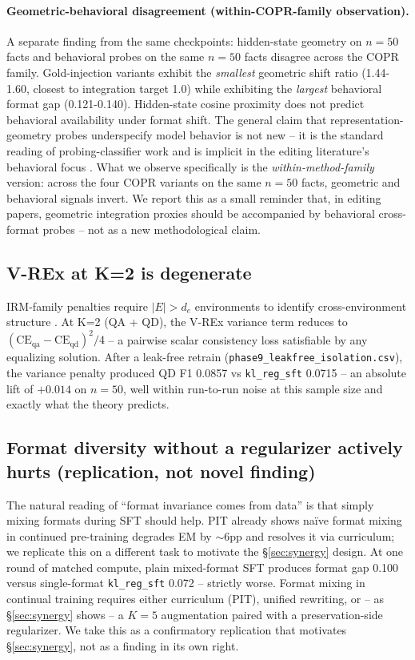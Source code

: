 \documentclass[11pt]{article}
\newcommand{\code}[1]{\texttt{\small #1}}
\begin{document}
\paragraph{Geometric-behavioral disagreement (within-COPR-family observation).}
A separate finding from the same checkpoints: hidden-state geometry on
$n=50$ facts and behavioral probes on the same $n=50$ facts disagree across
the COPR family. Gold-injection variants exhibit the \emph{smallest}
geometric shift ratio (1.44-1.60, closest to integration target 1.0) while
exhibiting the \emph{largest} behavioral format gap (0.121-0.140).
Hidden-state cosine proximity does not predict behavioral availability
under format shift. The general claim that representation-geometry probes
underspecify model behavior is not new -- it is the standard reading of
probing-classifier work \citep{belinkov2022probing} and is implicit in the
editing literature's behavioral focus \citep{cohen2023ripple}. What we
observe specifically is the \emph{within-method-family} version: across
the four COPR variants on the same $n=50$ facts, geometric and behavioral
signals invert. We report this as a small reminder that, in editing
papers, geometric integration proxies should be accompanied by behavioral
cross-format probes -- not as a new methodological claim.

\subsection{V-REx at K=2 is degenerate}

IRM-family penalties require $|E| > d_e$ environments to identify
cross-environment structure \citep{arjovsky2019irm, rosenfeld2021risks,
ahuja2021empirical}. At K=2 (QA + QD), the V-REx variance term reduces to
$(\mathrm{CE}_{\mathrm{qa}} - \mathrm{CE}_{\mathrm{qd}})^2 / 4$ -- a
pairwise scalar consistency loss satisfiable by any equalizing solution.
After a leak-free retrain (\code{phase9\_leakfree\_isolation.csv}), the
variance penalty produced QD F1 0.0857 vs \code{kl\_reg\_sft} 0.0715 -- an
absolute lift of $+0.014$ on $n=50$, well within run-to-run noise at this
sample size and exactly what the theory predicts.

\subsection{Format diversity without a regularizer actively hurts (replication, not novel finding)}

The natural reading of ``format invariance comes from data'' is that
simply mixing formats during SFT should help. PIT \citep{jiang2024pit}
already shows na\"ive format mixing in continued pre-training degrades
EM by $\sim$6pp and resolves it via curriculum; we replicate this on a
different task to motivate the \S\ref{sec:synergy} design. At one round
of matched compute, plain mixed-format SFT produces format gap 0.100
versus single-format \code{kl\_reg\_sft} 0.072 -- strictly worse. Format
mixing in continual training requires either curriculum (PIT), unified
rewriting, or -- as \S\ref{sec:synergy} shows -- a $K=5$ augmentation
paired with a preservation-side regularizer. We take this as a
confirmatory replication that motivates \S\ref{sec:synergy}, not as a
finding in its own right.
\end{document}

